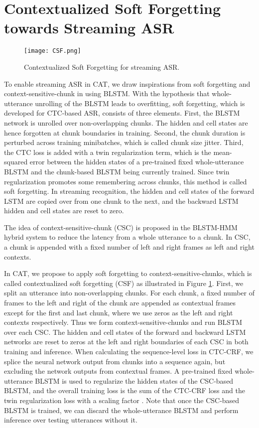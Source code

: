 \documentclass[a4paper]{article}
\begin{document}
\section{Contextualized Soft Forgetting towards Streaming ASR}
\begin{figure}[t]
	\centering
	\centerline{\texttt{[image: CSF.png]}}
\caption{Contextualized Soft Forgetting for streaming ASR.}
	\label{CSF_fig}
		\vspace{-0.25cm}
\end{figure}
To enable streaming ASR in CAT, we draw inspirations from soft forgetting \cite{SForgetting} and context-sensitive-chunk \cite{LC-BLSTM} in using BLSTM.
With the hypothesis that whole-utterance unrolling of the BLSTM leads to overfitting, soft forgetting, which is developed for CTC-based ASR, consists of three elements. First, the BLSTM network is unrolled over non-overlapping chunks. The hidden and cell states are hence forgotten at chunk boundaries in training. Second, the chunk duration is perturbed across training minibatches, which is called chunk size jitter. Third, the CTC loss is added with a twin regularization term, which is the mean-squared error between the hidden states of a pre-trained fixed whole-utterance BLSTM and the chunk-based BLSTM being currently trained. Since twin regularization promotes some remembering across chunks, this method is called soft forgetting.
In streaming recognition, the hidden and cell states of the forward LSTM are copied over from one chunk to the next, and the backward LSTM hidden and cell states are reset to zero.

The idea of context-sensitive-chunk (CSC) is proposed in the BLSTM-HMM hybrid system to reduce the latency from a whole utterance to a chunk.
In CSC, a chunk is appended with a fixed number of left and right frames as left and right contexts.

In CAT, we propose to apply soft forgetting to context-sensitive-chunks, which is called contextualized soft forgetting (CSF) as illustrated in Figure \ref{CSF_fig}. 
First, we split an utterance into non-overlapping chunks.
For each chunk, a fixed number of frames to the left and right of the chunk are appended as contextual frames except for the first and last chunk, where we use zeros as the left and right contexts respectively. Thus we form context-sensitive-chunks and run BLSTM over each CSC.
The hidden and cell states of the forward and backward LSTM networks are reset to zeros at the left and right boundaries of each CSC in both training and inference.
When calculating the sequence-level loss in CTC-CRF, we splice the neural network output from chunks into a sequence again, but excluding the network outputs from contextual frames.
A pre-trained fixed whole-utterance BLSTM is used to regularize the hidden states of the CSC-based BLSTM, and the overall training loss is the sum of the CTC-CRF loss and the twin regularization loss with a scaling factor . 
Note that once the CSC-based BLSTM is trained, we can discard the whole-utterance BLSTM and perform inference over testing utterances without it.
\end{document}
